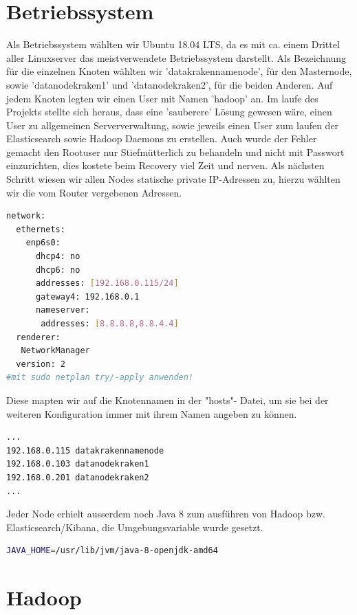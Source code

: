 \documentclass[12pt,oneside,a4paper,parskip]{scrbook}
\begin{document}
\section{Betriebssystem} Als Betriebssystem wählten wir Ubuntu 18.04 LTS, da es mit ca. einem Drittel aller Linuxserver das meistverwendete Betriebssystem darstellt. Als Bezeichnung für die einzelnen Knoten wählten wir 'datakrakennamenode', für den Masternode, sowie 'datanodekraken1' und 'datanodekraken2', für die beiden Anderen. Auf jedem Knoten legten wir einen User mit Namen 'hadoop' an. Im laufe des Projekts stellte sich heraus, dass eine 'sauberere' Lösung gewesen wäre, einen User zu allgemeinen Serververwaltung, sowie jeweils einen User zum laufen der Elasticsearch sowie Hadoop Daemons zu erstellen. Auch wurde der Fehler gemacht den Rootuser nur Stiefmütterlich zu behandeln und nicht mit Passwort einzurichten, dies kostete beim Recovery viel Zeit und nerven.\newline
Als nächsten Schritt wiesen wir allen Nodes statische private IP-Adressen zu, hierzu wählten wir die vom Router vergebenen Adressen. \pagebreak
\begin{lstlisting}[caption=datakrakennamenode: /etc/netplan/00-installer-config.yaml,label=hosts,language=bash]
network:
  ethernets:
    enp6s0:
      dhcp4: no
      dhcp6: no
      addresses: [192.168.0.115/24]
      gateway4: 192.168.0.1
      nameserver:
       addresses: [8.8.8.8,8.8.4.4]
  renderer:
   NetworkManager
  version: 2
#mit sudo netplan try/-apply anwenden!
\end{lstlisting}
Diese mapten wir auf die Knotennamen in der "hosts"- Datei, um sie bei der weiteren Konfiguration immer mit ihrem Namen angeben zu können.
\begin{lstlisting}[caption=etc/hosts,label=hosts,language=bash]
...
192.168.0.115 datakrakennamenode
192.168.0.103 datanodekraken1
192.168.0.201 datanodekraken2
...
\end{lstlisting}
Jeder Node erhielt ausserdem noch Java 8 zum ausführen von Hadoop bzw. Elasticsearch/Kibana, die Umgebungsvariable wurde gesetzt.
\begin{lstlisting}[caption=etc/environment,label=javaenv,language=bash]
JAVA_HOME=/usr/lib/jvm/java-8-openjdk-amd64
\end{lstlisting}

\section{Hadoop}
\end{document}
